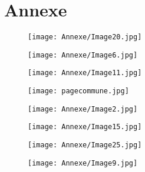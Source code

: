 \chapter*{Annexe} 


  \begin{figure}[H]
   \centering
   \texttt{[image: Annexe/Image20.jpg]}
	\caption{\cite{journallimbour}}\label{fig:limbour2}
    \end{figure}

  \begin{figure}[H]
   \centering
   \texttt{[image: Annexe/Image6.jpg]}
	\caption{\cite{journallimbour}}\label{fig:journallimbour}
    \end{figure}

    \begin{figure}[H]
   \centering
   \texttt{[image: Annexe/Image11.jpg]}
	\caption{\cite{plafondodeon}}\label{fig:odeon}
    \end{figure}


  \begin{figure}[H]
   \centering
   \texttt{[image: pagecommune.jpg]}
	\caption{\cite{commune}}\label{fig:Massoncommune}
    \end{figure}



   \begin{figure}[H]
   \centering
   \texttt{[image: Annexe/Image2.jpg]}
	\caption{\cite{courbetcommunard}}\label{fig:commune}
    \end{figure}


  \begin{figure}[H]
   \centering
   \texttt{[image: Annexe/Image15.jpg]}
	\caption{\cite{courbetcommunard}}\label{fig:courbetcommune}
    \end{figure}


   \begin{figure}[H]
   \centering
   \texttt{[image: Annexe/Image25.jpg]}
	\caption{\cite{peindrefinjeu}}\label{fig:peindrefinjeu}
    \end{figure}


   \begin{figure}[H]
   \centering
   \texttt{[image: Annexe/Image9.jpg]}
	\caption{\cite{entretienmasson}}\label{fig:masson}
    \end{figure}

